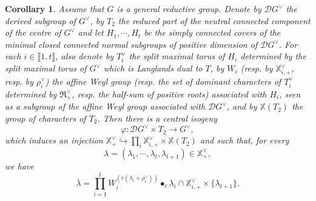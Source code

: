 \documentclass[11pt]{amsart}
\theoremstyle{plain}
\newtheorem{coro}[thm]{Corollary}
\theoremstyle{remark}
\numberwithin{equation}{section}
\begin{document}
	\begin{coro}\label{coro 44}
Assume that $G$ is a general reductive group. Denote by $\mathcal{D}G^\vee$ the derived subgroup of $G^\vee$, by $T_2$ the reduced part of the neutral connected component of the centre of $G^\vee$ and let $H_1,\cdots,H_t$ be the simply connected covers of the minimal closed connected normal subgroups of positive dimension of $\mathcal{D}G^\vee$. For each $i\in \llbracket 1,t\rrbracket$, also denote by $T^\vee_i$ the split maximal torus of $H_i$ determined by the split maximal torus of $G^\vee$ which is Langlands dual to $T$, by $W_i$ (resp. by $\mathbb{X}^\vee_{i,+}$, resp. by $\rho^\vee_i$) the affine Weyl group (resp. the set of dominant characters of $T^\vee_i$ determined by $\mathfrak{R}_+^\vee$, resp. the half-sum of positive roots) associated with $H_i$, seen as a subgroup of the affine Weyl group associated with $\mathcal{D}G^\vee$, and by $\mathbb{X}(T_2)$ the group of characters of $T_2$. Then there is a central isogeny
		$$\varphi:\mathcal{D}G^\vee\times T_2\to G^\vee, $$
		which induces an injection $\mathbb{X}^\vee_+\hookrightarrow\prod_i\mathbb{X}^\vee_{i,+}\times \mathbb{X}(T_2)$ and such that, for every $$\lambda=(\lambda_1,\cdots,\lambda_t,\lambda_{t+1})\in\mathbb{X}^\vee_+ ,$$ we have
		$$\overline{\lambda}=\prod_{i=1}^tW_i^{(r(\lambda_i+\rho_i^\vee))}\bullet_\ell\lambda_i\cap \mathbb{X}^\vee_{i,+}\times\{\lambda_{t+1}\}.$$
	\end{coro}
\end{document}
